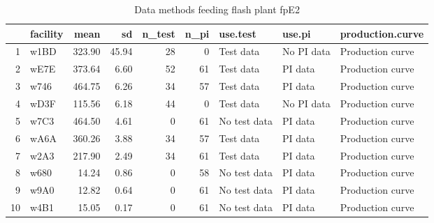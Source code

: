 \begin{table}[H]
\centering
\begin{tabular}{rlrrrrlll}
  \hline
 & facility & mean & sd & n\_test & n\_pi & use.test & use.pi & production.curve \\ 
  \hline
1 & w1BD & 323.90 & 45.94 &  28 &   0 & Test data & No PI data & Production curve \\ 
  2 & wE7E & 373.64 & 6.60 &  52 &  61 & Test data & PI data & Production curve \\ 
  3 & w746 & 464.75 & 6.26 &  34 &  57 & Test data & PI data & Production curve \\ 
  4 & wD3F & 115.56 & 6.18 &  44 &   0 & Test data & No PI data & Production curve \\ 
  5 & w7C3 & 464.50 & 4.61 &   0 &  61 & No test data & PI data & Production curve \\ 
  6 & wA6A & 360.26 & 3.88 &  34 &  57 & Test data & PI data & Production curve \\ 
  7 & w2A3 & 217.90 & 2.49 &  34 &  61 & Test data & PI data & Production curve \\ 
  8 & w680 & 14.24 & 0.86 &   0 &  58 & No test data & PI data & Production curve \\ 
  9 & w9A0 & 12.82 & 0.64 &   0 &  61 & No test data & PI data & Production curve \\ 
  10 & w4B1 & 15.05 & 0.17 &   0 &  61 & No test data & PI data & Production curve \\ 
   \hline
\end{tabular}
\caption{Data methods feeding flash plant fpE2} 
\label{tab:well_summaries_fp14}
\end{table}
